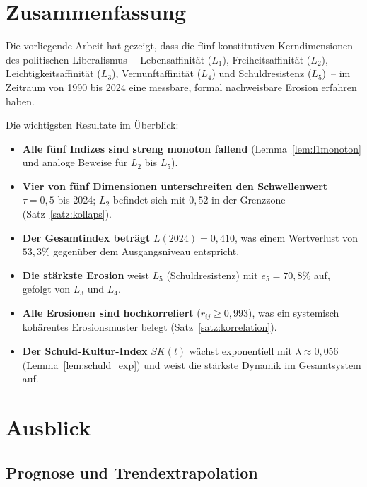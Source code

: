 ﻿\documentclass[a4paper,12pt]{article}
\theoremstyle{definition}
\begin{document}
\section{Zusammenfassung}

Die vorliegende Arbeit hat gezeigt, dass die fünf konstitutiven Kerndimensionen des politischen Liberalismus~-- Lebensaffinität ($L_1$), Freiheitsaffinität ($L_2$), Leichtigkeitsaffinität ($L_3$), Vernunftaffinität ($L_4$) und Schuldresistenz ($L_5$)~-- im Zeitraum von 1990 bis 2024 eine messbare, formal nachweisbare Erosion erfahren haben.

Die wichtigsten Resultate im Überblick:

\begin{itemize}
	\item \textbf{Alle fünf Indizes sind streng monoton fallend} (Lemma~\ref{lem:l1monoton} und analoge Beweise für $L_2$ bis $L_5$).
	\item \textbf{Vier von fünf Dimensionen unterschreiten den Schwellenwert} $\tau = 0{,}5$ bis 2024; $L_2$ befindet sich mit $0{,}52$ in der Grenzzone (Satz~\ref{satz:kollaps}).
	\item \textbf{Der Gesamtindex beträgt} $\bar{L}(2024) = 0{,}410$, was einem Wertverlust von $53{,}3\%$ gegenüber dem Ausgangsniveau entspricht.
	\item \textbf{Die stärkste Erosion} weist $L_5$ (Schuldresistenz) mit $e_5 = 70{,}8\%$ auf, gefolgt von $L_3$ und $L_4$.
	\item \textbf{Alle Erosionen sind hochkorreliert} ($r_{ij} \geq 0{,}993$), was ein systemisch kohärentes Erosionsmuster belegt (Satz~\ref{satz:korrelation}).
	\item \textbf{Der Schuld-Kultur-Index} $SK(t)$ wächst exponentiell mit $\lambda \approx 0{,}056$ (Lemma~\ref{lem:schuld_exp}) und weist die stärkste Dynamik im Gesamtsystem auf.
\end{itemize}

\section{Ausblick}

\subsection{Prognose und Trendextrapolation}
\end{document}
